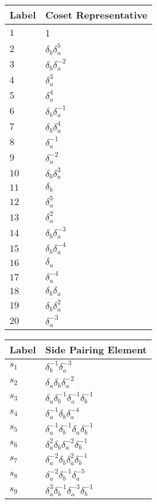 \documentclass{article}
\begin{document}
\begin{center}
\begin{tabular}{ll}
\toprule
Label & Coset Representative\\
\midrule
$1$ & 1 \\
$2$ & $\delta_b^{}\delta_a^{5}$ \\
$3$ & $\delta_b^{}\delta_a^{-2}$ \\
$4$ & $\delta_a^{3}$ \\
$5$ & $\delta_a^{4}$ \\
$6$ & $\delta_b^{}\delta_a^{-1}$ \\
$7$ & $\delta_b^{}\delta_a^{4}$ \\
$8$ & $\delta_a^{-1}$ \\
$9$ & $\delta_a^{-2}$ \\
$10$ & $\delta_b^{}\delta_a^{3}$ \\
$11$ & $\delta_b^{}$ \\
$12$ & $\delta_a^{5}$ \\
$13$ & $\delta_a^{2}$ \\
$14$ & $\delta_b^{}\delta_a^{-3}$ \\
$15$ & $\delta_b^{}\delta_a^{-4}$ \\
$16$ & $\delta_a^{}$ \\
$17$ & $\delta_a^{-4}$ \\
$18$ & $\delta_b^{}\delta_a^{}$ \\
$19$ & $\delta_b^{}\delta_a^{2}$ \\
$20$ & $\delta_a^{-3}$ \\
\bottomrule
\end{tabular}
\hfill
\begin{tabular}{ll}
\toprule
Label & Side Pairing Element\\
\midrule
$s_{1}$ & $\delta_b^{-1}\delta_a^{-3}$ \\
$s_{2}$ & $\delta_a^{}\delta_b^{}\delta_a^{-2}$ \\
$s_{3}$ & $\delta_a^{}\delta_b^{-1}\delta_a^{-1}\delta_b^{-1}$ \\
$s_{4}$ & $\delta_a^{-1}\delta_b^{}\delta_a^{-4}$ \\
$s_{5}$ & $\delta_a^{-1}\delta_b^{-1}\delta_a^{}\delta_b^{-1}$ \\
$s_{6}$ & $\delta_a^{2}\delta_b^{}\delta_a^{-2}\delta_b^{-1}$ \\
$s_{7}$ & $\delta_a^{-2}\delta_b^{}\delta_a^{2}\delta_b^{-1}$ \\
$s_{8}$ & $\delta_a^{-2}\delta_b^{-1}\delta_a^{-5}$ \\
$s_{9}$ & $\delta_a^{3}\delta_b^{-1}\delta_a^{-3}\delta_b^{-1}$ \\

\end{tabular}
\end{center}
\end{document}
